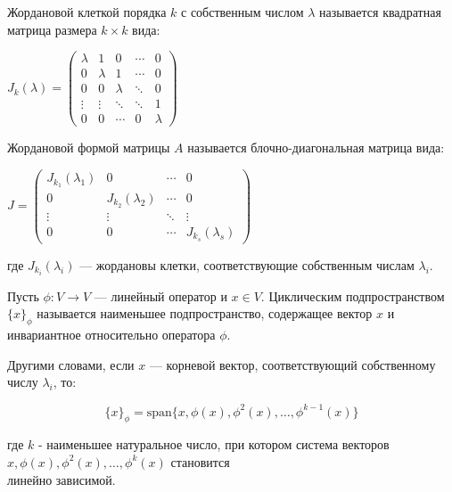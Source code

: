 \vspace{0.3cm}

\begin{shdef}
    \begin{definition}
        \leavevmode \nl 
        
        Жордановой клеткой порядка $k$ с собственным числом $\lambda$ называется квадратная матрица размера $k \times k$ вида:
        
        $J_k(\lambda) = \begin{pmatrix}
            \lambda & 1 & 0 & \cdots & 0 \\
            0 & \lambda & 1 & \cdots & 0 \\
            0 & 0 & \lambda & \ddots & 0 \\
            \vdots & \vdots & \ddots & \ddots & 1 \\
            0 & 0 & \cdots & 0 & \lambda
        \end{pmatrix}$
    \end{definition}
\end{shdef}

\begin{shdef}
    \begin{definition}
        \leavevmode \nl 
        
        Жордановой формой матрицы $A$ называется блочно-диагональная матрица вида:
        
        $J = \begin{pmatrix}
            J_{k_1}(\lambda_1) & 0 & \cdots & 0 \\
            0 & J_{k_2}(\lambda_2) & \cdots & 0 \\
            \vdots & \vdots & \ddots & \vdots \\
            0 & 0 & \cdots & J_{k_s}(\lambda_s)
        \end{pmatrix}$
        
        где $J_{k_i}(\lambda_i)$ — жордановы клетки, соответствующие собственным числам $\lambda_i$.
    \end{definition}
\end{shdef}


\begin{shdef}
    \begin{definition}
        \leavevmode \nl 
        
        Пусть $\phi: V \to V$ — линейный оператор и $x \in V$. Циклическим подпространством $\{x\}_{\phi}$ называется наименьшее подпространство, содержащее вектор $x$ и \\инвариантное относительно оператора $\phi$.
        
        Другими словами, если $x$ — корневой вектор, соответствующий собственному \\числу $\lambda_i$, то:
        
        $$\{x\}_{\phi} = \text{span}\{x, \phi(x), \phi^2(x), \dots, \phi^{k-1}(x)\}$$
        
        где $k$ - наименьшее натуральное число, при котором система векторов $x, \phi(x), \phi^2(x), \dots, \phi^k(x)$ становится \\линейно зависимой.
    \end{definition}
\end{shdef}

